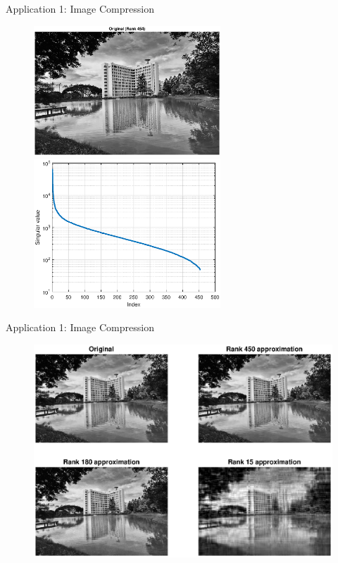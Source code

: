 \documentclass[aspectratio=169,xcolor=dvipsnames]{beamer}
\begin{document}
\begin{frame}{Application 1: Image Compression}
   \begin{figure}[h]
\includegraphics[width=7cm]{images/ori.eps}
\includegraphics[width=7cm]{images/sv.eps}
\label{Fig2a}
\end{figure}
\end{frame}

\begin{frame}{Application 1: Image Compression}
   \begin{figure}[h]
\includegraphics[width=12cm]{images/svdlowrank.eps}
\label{Fig2}
\end{figure}
\end{frame}
\end{document}
